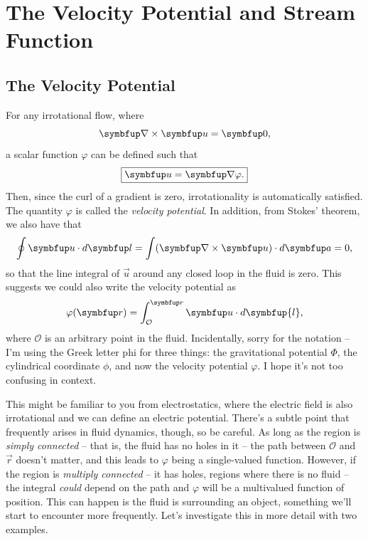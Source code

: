 \section{The Velocity Potential and Stream Function}

\subsection{The Velocity Potential}

For any irrotational flow, where
\[
\curl \uu = \vec{0},
\]
a scalar function $\varphi$ can be defined such that
\begin{equation}
\label{eq_vel_pot}
\boxed{
\uu = \grad \varphi.
}
\end{equation}
Then, since the curl of a gradient is zero, irrotationality is automatically satisfied. The quantity $\varphi$ is called the \emph{velocity potential}.  In addition, from Stokes' theorem, we also have that
\[
\oint \uu \cdot d\vec{l} = \int (\curl \uu) \cdot d\vec{a} = 0,
\]
so that the line integral of $\vec{u}$ around any closed loop in the fluid is zero.  This suggests we could also write the velocity potential as
\begin{equation}
\label{eq_vel_pot2}
\varphi(\vec{r}) = \int_{\mathcal{O}}^{\vec{r}} \uu \cdot d\symbfup{l},
\end{equation}
where $\mathcal{O}$ is an arbitrary point in the fluid.  Incidentally, sorry for the notation -- I'm using the Greek letter phi for three things:  the gravitational potential $\Phi$, the cylindrical coordinate $\phi$, and now the velocity potential $\varphi$.  I hope it's not too confusing in context.

This might be familiar to you from electrostatics, where the electric field is also irrotational and we can define an electric potential.  There's a subtle point that frequently arises in fluid dynamics, though, so be careful.  As long as the region is \emph{simply connected} -- that is, the fluid has no holes in it -- the path between $\mathcal{O}$ and $\vec{r}$ doesn't matter, and this leads to $\varphi$ being a single-valued function.  However, if the region is \emph{multiply connected} -- it has holes, regions where there is no fluid -- the integral \emph{could} depend on the path and $\varphi$ will be a multivalued function of position.  This can happen is the fluid is surrounding an object, something we'll start to encounter more frequently.  Let's investigate this in more detail with two examples.

